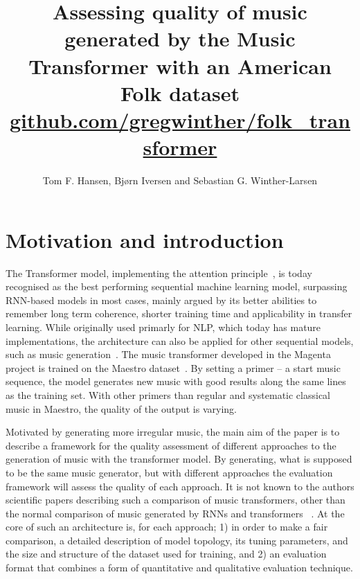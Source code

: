 \documentclass{article}
\title{Assessing quality of music generated by the Music Transformer with an American Folk dataset \\
    \normalsize{\url{github.com/gregwinther/folk_transformer}}}
\author{Tom F. Hansen, Bjørn Iversen and Sebastian G. Winther-Larsen}
\begin{document}
    \maketitle

    \section{Motivation and introduction}

        The Transformer model, implementing the attention principle~\cite{vaswani2017attention},
        is today recognised as the best performing sequential machine learning model,
        surpassing RNN-based models in most cases, mainly argued by its better abilities
        to remember long term coherence, shorter training time and applicability in transfer learning.
        While originally used primarly for NLP, which today has mature implementations,
        the architecture can also be applied for other sequential models,
        such as music generation~\cite{huang2018music}.
        The music transformer developed in the Magenta project is trained on the Maestro
        dataset~\cite{maestrodataset}.
        By setting a primer – a start music sequence, the model generates new music with good
        results along the same lines as the training set. With other primers than regular and
        systematic classical music in Maestro, the quality of the output is varying.
        
        Motivated by generating more irregular music, the main aim of the paper is
        to describe a framework for the quality assessment of different approaches to the generation 
        of music with the transformer model. By generating, what is supposed to be the same 
        music generator, but with different approaches the evaluation framework will assess 
        the quality of each approach. It is not known to the authors scientific papers
        describing such a comparison of music transformers, other than the normal
        comparison of music generated by RNNs and transformers ~\cite{huang2018music}.
        At the core
        of such an architecture is, for each approach; 1) in order to make a fair comparison,
        a detailed description of model topology, its tuning parameters, and the size
        and structure of the dataset used for training, and 2) an evaluation format
        that combines a form of quantitative and qualitative evaluation technique.
       
\end{document}
